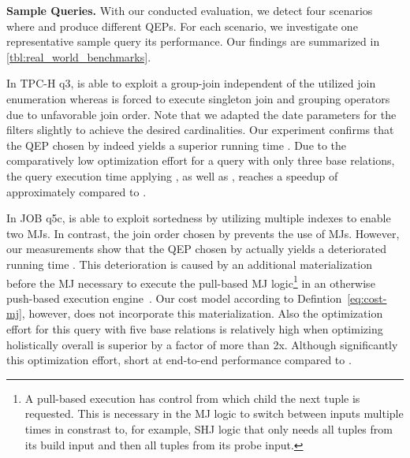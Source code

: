 \textbf{Sample Queries.}
With our conducted evaluation, we detect four scenarios where \split and \holistic produce different QEPs.  For each scenario, we investigate one representative sample query \wrt its performance.  Our findings are summarized in \autoref{tbl:real_world_benchmarks}.

In TPC-H q3, \holistic is able to exploit a group-join independent of the utilized join enumeration whereas \split is forced to execute singleton join and grouping operators due to unfavorable join order.  Note that we adapted the date parameters for the filters slightly to achieve the desired cardinalities.  Our experiment confirms that the QEP chosen by \holistic {}indeed yields a superior running time .  Due to the comparatively low optimization effort for a query with only three base relations, the query execution time  applying \holistic, as well as  , reaches a speedup of approximately  compared to \split.

In JOB q5c, \holistic is able to exploit sortedness by utilizing multiple indexes to enable two MJs.  In contrast, the join order chosen by \split prevents the use of MJs.  However, our measurements show that the QEP chosen by \holistic {}actually yields a deteriorated running time .  This deterioration is caused by an additional materialization before the MJ necessary to execute the pull-based MJ logic\footnote{A pull-based execution has control from which child the next tuple is requested.  This is necessary in the MJ logic to switch between inputs multiple times in constrast to, for example, SHJ logic that only needs all tuples from its build input and then all tuples from its probe input.} in an otherwise push-based execution engine~.  Our cost model according to Defintion~\ref{eq:cost-mj}, however, does not incorporate this materialization.  Also the optimization effort for this query with five base relations is relatively high when optimizing holistically \sut \split overall is superior by a factor of more than 2x.  Although   significantly  this optimization effort,  short at end-to-end performance compared to \split.

